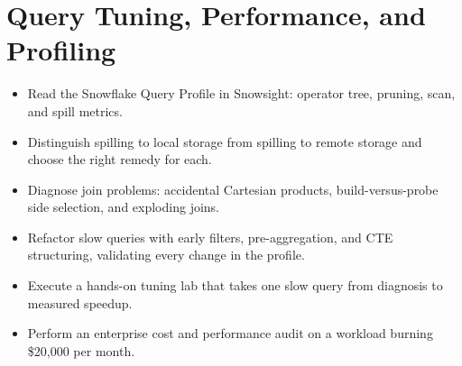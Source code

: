 \chapter{Query Tuning, Performance, and Profiling}
%
\begin{objectives}
\begin{itemize}
    \item Read the Snowflake Query Profile in Snowsight: operator tree, pruning, scan, and spill metrics.
    \item Distinguish spilling to local storage from spilling to remote storage and choose the right remedy for each.
    \item Diagnose join problems: accidental Cartesian products, build-versus-probe side selection, and exploding joins.
    \item Refactor slow queries with early filters, pre-aggregation, and CTE structuring, validating every change in the profile.
    \item Execute a hands-on tuning lab that takes one slow query from diagnosis to measured speedup.
    \item Perform an enterprise cost and performance audit on a workload burning \$20{,}000 per month.
\end{itemize}
\end{objectives}


